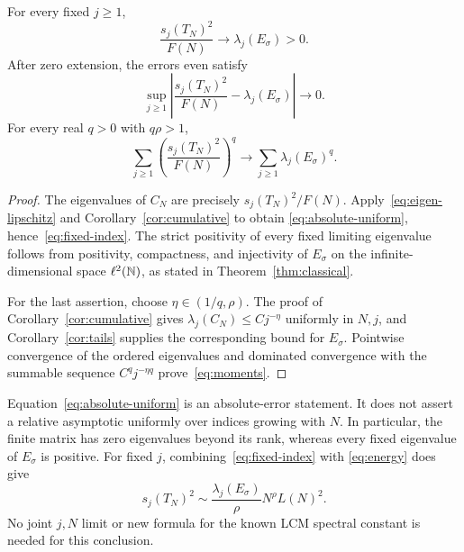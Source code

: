 \begin{corollary}
\label{cor:singular-values}
For every fixed $j\ge1$,
\begin{equation}
 \frac{s_j(T_N)^2}{F(N)}\longrightarrow
 \lambda_j(E_\sigma)>0.
 \label{eq:fixed-index}
\end{equation}
After zero extension, the errors even satisfy
\begin{equation}
 \sup_{j\ge1}
 \left|\frac{s_j(T_N)^2}{F(N)}-\lambda_j(E_\sigma)\right|
 \longrightarrow0.
 \label{eq:absolute-uniform}
\end{equation}
For every real $q>0$ with $q\rho>1$,
\begin{equation}
 \sum_{j\ge1}\left(\frac{s_j(T_N)^2}{F(N)}\right)^q
 \longrightarrow\sum_{j\ge1}\lambda_j(E_\sigma)^q.
 \label{eq:moments}
\end{equation}
\end{corollary}

\begin{proof}
The eigenvalues of $C_N$ are precisely $s_j(T_N)^2/F(N)$.
Apply~\eqref{eq:eigen-lipschitz} and
Corollary~\ref{cor:cumulative} to obtain
\eqref{eq:absolute-uniform}, hence~\eqref{eq:fixed-index}.
The strict positivity of every fixed limiting eigenvalue follows
from positivity, compactness, and injectivity of $E_\sigma$ on
the infinite-dimensional space $\ell^2(\mathbb N)$, as stated in
Theorem~\ref{thm:classical}.

For the last assertion, choose $\eta\in(1/q,\rho)$.
The proof of Corollary~\ref{cor:cumulative} gives
$\lambda_j(C_N)\le Cj^{-\eta}$ uniformly in $N,j$, and
Corollary~\ref{cor:tails} supplies the corresponding bound for
$E_\sigma$. Pointwise convergence of the ordered eigenvalues
and dominated convergence with the summable sequence
$C^qj^{-\eta q}$ prove~\eqref{eq:moments}.
\end{proof}

Equation~\eqref{eq:absolute-uniform} is an absolute-error statement.
It does not assert a relative asymptotic uniformly over indices growing
with $N$. In particular, the finite matrix has zero eigenvalues beyond
its rank, whereas every fixed eigenvalue of $E_\sigma$ is positive.
For fixed $j$, combining~\eqref{eq:fixed-index} with
\eqref{eq:energy} does give
\begin{equation}
 s_j(T_N)^2\sim
 \frac{\lambda_j(E_\sigma)}{\rho}N^\rho L(N)^2.
 \label{eq:fixed-index-asymptotic}
\end{equation}
No joint $j,N$ limit or new formula for the known LCM spectral
constant is needed for this conclusion.

